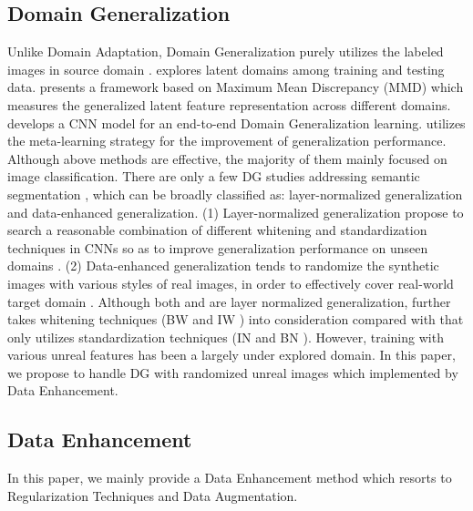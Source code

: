 \documentclass[twocolumn,journal,vlined,ruled,linesnumbered]{IEEEtran}
\begin{document}
\subsection{Domain Generalization\label{subsec:Domain-Generalization}}

Unlike Domain Adaptation, Domain Generalization purely utilizes the labeled images in source domain \cite{muandet2013domain,gan2016learning}. \cite{gong2013reshaping} explores latent domains among training and testing data. \cite{li2018domain} presents a framework based on Maximum Mean Discrepancy (MMD) which measures the generalized latent feature representation across different domains. \cite{li2017deeper} develops a CNN model for an end-to-end Domain Generalization learning. \cite{li2018learning} utilizes the meta-learning strategy for the improvement of generalization performance. Although above methods are effective, the majority of them mainly focused on image classification. There are only a few DG studies addressing semantic segmentation \cite{yue2019domain,pan2018two,pan2019switchable}, which can be broadly classified as: layer-normalized generalization and data-enhanced generalization. (1) Layer-normalized generalization propose to search a reasonable combination of different whitening and standardization techniques in CNNs so as to improve generalization performance on unseen domains \cite{pan2018two,pan2019switchable}. (2) Data-enhanced generalization tends to randomize the synthetic images with various styles of real images, in order to effectively cover real-world target domain \cite{yue2019domain}. Although both \cite{pan2018two} and \cite{pan2019switchable} are layer normalized generalization, \cite{pan2019switchable} further takes whitening techniques (BW \cite{huang2018decorrelated} and IW \cite{li2017universal}) into consideration compared with \cite{pan2018two} that only utilizes standardization techniques (IN \cite{ulyanov2016instance} and BN \cite{ioffe2015batch}). However, training with various unreal features has been a largely under explored domain. In this paper, we propose to handle DG with randomized unreal images which implemented by Data Enhancement.

\subsection{Data Enhancement\label{subsec:Data-Enhancement}}

In this paper, we mainly provide a Data Enhancement method which resorts to Regularization Techniques and Data Augmentation.
\end{document}
